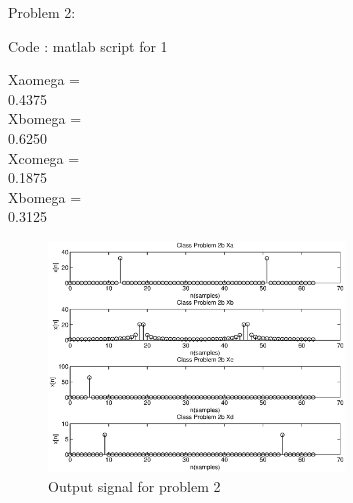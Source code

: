 
{\LARGE Problem 2:}\newline





\begin{center}
{Code : matlab script for 1}
\end{center}



Xaomega = \\

    0.4375 \\


Xbomega = \\

    0.6250 \\


Xcomega = \\

   0.1875 \\


Xbomega = \\

    0.3125 \\


\begin{figure}[!h]
  \centering
    \includegraphics[width=0.7\textwidth]{matlab_script/class21_11_13.eps}
  \caption{Output signal for problem 2}
\end{figure}
\pagebreak
